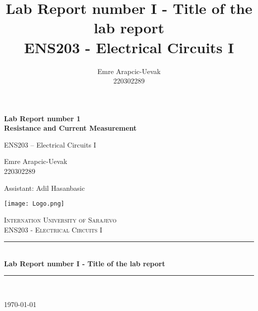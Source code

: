 \documentclass[a4paper, 10pt]{article}
\title{Lab Report number I - Title of the lab report\\
	ENS203 - Electrical Circuits I}
\author{Emre Arapcic-Uevak\\220302289}
\date{}
\begin{document}
	\begin{titlepage}
		\begin{center}

			{\Large\bfseries Lab Report number 1 \\[0.5em] Resistance and Current Measurement\par}
			\vspace{1cm} %

			{\large ENS203 – Electrical Circuits I\par}
			\vspace{1cm} %

			{\large Emre Arapcic-Uevak \\ 220302289\par}
			\vspace{1cm} %

			{\large Assistant: Adil Hasanbasic\par}
			\texttt{[image: Logo.png]}
			\vspace{5mm}
			
			\textsc{\LARGE Internation University of Sarajevo}\\[1.5cm]
			\textsc{\Large ENS203 - Electrical Circuits I}\\[0.5cm]
			
			\rule{\linewidth}{0.5mm} \\[0.4cm]
			{ \huge \bfseries Lab Report number I - Title of the lab report}\\[0.4cm]
			\rule{\linewidth}{0.5mm} \\[1.5cm]
			
			\vfill
			
			{\large \today}
		\end{center}
	\end{titlepage}
	\pagebreak

	\tableofcontents
	\pagebreak
	
	\listoffigures
	\pagebreak
	
\end{document}
